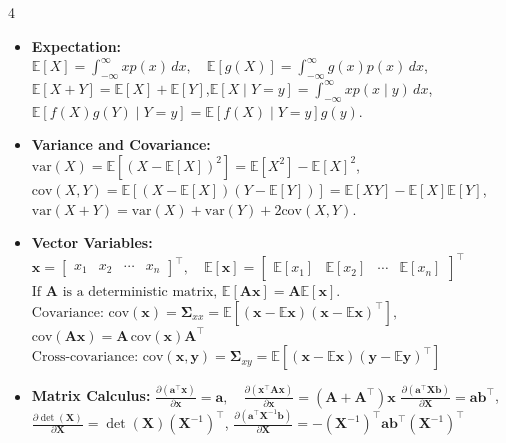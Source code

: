 \documentclass[10pt]{article}
\newcommand{\bulletPoint}[1]{\ul{\textit{\textbf{#1}}}}
\begin{document}
\begin{multicols*}{4}
\begin{itemize}[label=$\cdot$,leftmargin=0pt]
\item\textbf{Expectation:}  %
$\mathbb{E}[X] = \int_{-\infty}^{\infty} x p(x) \,dx, \quad \mathbb{E}[g(X)] = \int_{-\infty}^{\infty} g(x) p(x) \,dx$,\quad
$\mathbb{E}[X + Y] = \mathbb{E}[X] + \mathbb{E}[Y]$,\quad$\mathbb{E}[X \mid Y = y] = \int_{-\infty}^{\infty} x p(x \mid y) \,dx$,\quad
$\mathbb{E}[f(X) g(Y) \mid Y = y] = \mathbb{E}[f(X) \mid Y = y] g(y)$.
\item\textbf{Variance and Covariance:}  %
$\text{var}(X) = \mathbb{E}[(X - \mathbb{E}[X])^2] = \mathbb{E}[X^2] - \mathbb{E}[X]^2$,\quad
$\text{cov}(X,Y) = \mathbb{E}[(X - \mathbb{E}[X])(Y - \mathbb{E}[Y])] = \mathbb{E}[XY] - \mathbb{E}[X] \mathbb{E}[Y]$,\quad
$\text{var}(X + Y) = \text{var}(X) + \text{var}(Y) + 2 \text{cov}(X,Y)$.
\item \textbf{Vector Variables:}
$
\mathbf{x} =
\begin{bmatrix}
x_1 & x_2 & \cdots & x_n
\end{bmatrix}^{\top}, \quad
\mathbb{E}[\mathbf{x}] =
\begin{bmatrix}
\mathbb{E}[x_1] & \mathbb{E}[x_2] & \cdots & \mathbb{E}[x_n]
\end{bmatrix}^{\top}
$\quad
$\text{If } \mathbf{A} \text{ is a deterministic matrix, } \mathbb{E}[\mathbf{A} \mathbf{x}] = \mathbf{A} \mathbb{E}[\mathbf{x}].$\quad
$\text{Covariance: } \text{cov}(\mathbf{x}) = \mathbf{\Sigma}_{xx} = \mathbb{E}[(\mathbf{x} - \mathbb{E}\mathbf{x})(\mathbf{x} - \mathbb{E}\mathbf{x})^\top],$\quad
$\text{cov}(\mathbf{A} \mathbf{x}) = \mathbf{A} \, \text{cov}(\mathbf{x}) \mathbf{A}^\top$\quad
$\text{Cross-covariance: } \text{cov}(\mathbf{x}, \mathbf{y}) = \mathbf{\Sigma}_{xy} = \mathbb{E}[(\mathbf{x} - \mathbb{E}\mathbf{x})(\mathbf{y} - \mathbb{E}\mathbf{y})^\top]$
\item \textbf{Matrix Calculus:}
$\frac{\partial (\mathbf{a}^\top \mathbf{x})}{\partial \mathbf{x}} = \mathbf{a}, \quad
\frac{\partial (\mathbf{x}^\top \mathbf{A} \mathbf{x})}{\partial \mathbf{x}} = (\mathbf{A} + \mathbf{A}^\top) \mathbf{x}$\quad
$\frac{\partial (\mathbf{a}^\top \mathbf{X} \mathbf{b})}{\partial \mathbf{X}} = \mathbf{a} \mathbf{b}^\top$, \quad
$\frac{\partial \det(\mathbf{X})}{\partial \mathbf{X}} = \det(\mathbf{X}) (\mathbf{X}^{-1})^\top$, \quad
$\frac{\partial (\mathbf{a}^\top \mathbf{X}^{-1} \mathbf{b})}{\partial \mathbf{X}} = -(\mathbf{X}^{-1})^\top \mathbf{a} \mathbf{b}^\top (\mathbf{X}^{-1})^\top$

\end{itemize}


\end{multicols*}
\end{document}
